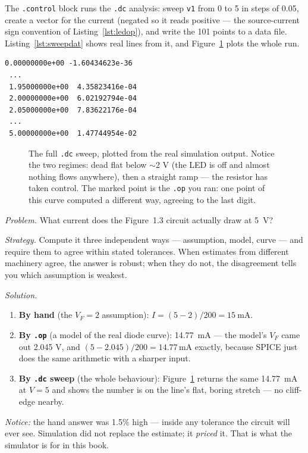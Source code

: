 The \texttt{.control} block runs the \texttt{.dc} analysis: sweep \texttt{v1}
from 0 to 5 in steps of 0.05, create a vector for the current (negated so it
reads positive — the source-current sign convention of
Listing~\ref{lst:ledop}), and write the 101 points to a data file.
Listing~\ref{lst:sweepdat} shows real lines from it, and
Figure~\ref{fig:sweep} plots the whole run.

\begin{lstlisting}[language={},numbers=none,caption={Real excerpt of
\texttt{figures/ch02/ch02\_sweep.dat} (voltage, then current in amps): first
line, the knee region, and the endpoint. The endpoint's 14.77 mA is
\emph{exactly} the \texttt{.op} answer — same equations, same result.},
label={lst:sweepdat}]
 0.00000000e+00 -1.60434623e-36
 ...
 1.95000000e+00  4.35823416e-04
 2.00000000e+00  6.02192794e-04
 2.05000000e+00  7.83622176e-04
 ...
 5.00000000e+00  1.47744954e-02
\end{lstlisting}

\begin{figure}[htbp]
\centering

\caption{The full \texttt{.dc} sweep, plotted from the real simulation output.
Notice the two regimes: dead flat below $\sim$2 V (the LED is off and almost
nothing flows anywhere), then a straight ramp — the resistor has taken
control. The marked point is the \texttt{.op} you ran: one point of this
curve computed a different way, agreeing to the last digit.}
\label{fig:sweep}
\end{figure}

\begin{example}
\label{ex:threeways}
\emph{Problem.} What current does the Figure~1.3 circuit actually draw at
\qty{5}{\volt}?\par
\emph{Strategy.} Compute it three independent ways — assumption, model,
curve — and require them to agree within stated tolerances. When estimates
from different machinery agree, the answer is robust; when they do not, the
disagreement tells you which assumption is weakest.\par
\emph{Solution.}
\begin{enumerate}
\item \textbf{By hand} (the $V_F=2$ assumption): $I = (5-2)/200 =
\qty{15}{\milli\ampere}$.
\item \textbf{By \texttt{.op}} (a model of the real diode curve):
\qty{14.77}{\milli\ampere} — the model's $V_F$ came out 2.045 V, and
$(5-2.045)/200 = 14.77$\,mA exactly, because SPICE just does the same
arithmetic with a sharper input.
\item \textbf{By \texttt{.dc} sweep} (the whole behaviour): Figure~\ref{fig:sweep}
returns the same \qty{14.77}{\milli\ampere} at $V=5$ and shows the number is
on the line's flat, boring stretch — no cliff-edge nearby.
\end{enumerate}
\emph{Notice:} the hand answer was 1.5\% high — inside any tolerance the
circuit will ever see. Simulation did not replace the estimate; it
\emph{priced} it. That is what the simulator is for in this book.
\end{example}

